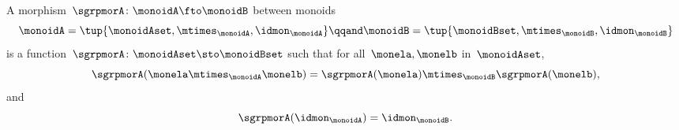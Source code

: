 \begin{ctdefinition}
    \label{def:monoid-mor}
    A morphism~$\sgrpmorA\colon \monoidA \fto \monoidB$ between monoids
    \begin{equation}
        \monoidA = \tup{\monoidAset, \mtimes_\monoidA, \idmon_\monoidA}
        \qqand
        \monoidB = \tup{\monoidBset, \mtimes_\monoidB, \idmon_\monoidB}
    \end{equation}
    is a function~$\sgrpmorA \colon \monoidAset \sto \monoidBset$ such that for all~$\monela, \monelb$ in~$\monoidAset$,
    \begin{equation}
        \label{eq:mon-mor-comp}
        \sgrpmorA (\monela \mtimes_{\monoidA} \monelb) = \sgrpmorA (\monela) \mtimes_{\monoidB}  \sgrpmorA(\monelb),
    \end{equation}
    and
    \begin{equation}
        \label{eq:mon-id-comp}
        \sgrpmorA (\idmon_\monoidA) = \idmon_{\monoidB}.
    \end{equation}
\end{ctdefinition}
